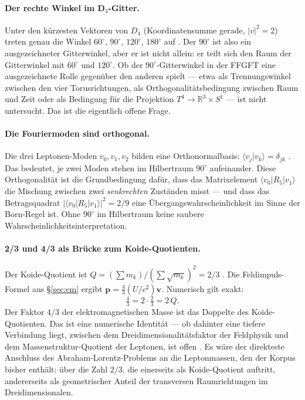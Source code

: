 \paragraph{Der rechte Winkel im D$_4$-Gitter.}
Unter den kürzesten Vektoren von $D_4$ (Koordinatensumme gerade,
$|v|^2 = 2$) treten genau die Winkel $60^\circ$, $90^\circ$, $120^\circ$,
$180^\circ$ auf \BM. Der $90^\circ$ ist also ein ausgezeichneter Gitterwinkel,
aber er ist nicht allein: er teilt sich den Raum der Gitterwinkel mit $60^\circ$
und $120^\circ$. Ob der $90^\circ$-Gitterwinkel in der FFGFT eine ausgezeichnete
Rolle gegenüber den anderen spielt --- etwa als Trennungswinkel zwischen den
vier Torusrichtungen, als Orthogonalitätsbedingung zwischen Raum und Zeit oder
als Bedingung für die Projektion $T^4 \to \mathbb R^3 \times S^1$ --- ist nicht
untersucht. Das ist die eigentlich offene Frage.

\paragraph{Die Fouriermoden sind orthogonal.}
Die drei Leptonen-Moden $v_0, v_1, v_2$ bilden eine Orthonormalbasis:
$\langle v_j | v_k\rangle = \delta_{jk}$ \BM. Das bedeutet, je zwei Moden stehen
im Hilbertraum $90^\circ$ aufeinander. Diese Orthogonalität ist die Grundbedingung
dafür, dass das Matrixelement $\langle v_0 | R_5 | v_1\rangle$ die Mischung
zwischen zwei \emph{senkrechten} Zuständen misst --- und dass das
Betragsquadrat $|\langle v_0|R_5|v_1\rangle|^2 = 2/9$ eine Übergangswahrscheinlichkeit
im Sinne der Born-Regel ist. Ohne $90^\circ$ im Hilbertraum keine saubere
Wahrscheinlichkeitsinterpretation.

\paragraph{2/3 und 4/3 als Brücke zum Koide-Quotienten.}
Der Koide-Quotient ist $Q = (\sum m_k)/(\sum\sqrt{m_k})^2 = 2/3$ \EM. Die
Feldimpuls-Formel aus §\ref{sec:em} ergibt $\mathbf p = \tfrac{4}{3}(U/c^2)\mathbf v$.
Numerisch gilt exakt:
\[
  \tfrac{4}{3} = 2 \cdot \tfrac{2}{3} = 2\,Q .
\]
Der Faktor $4/3$ der elektromagnetischen Masse ist das Doppelte des
Koide-Quotienten. Das ist eine numerische Identität --- ob dahinter eine
tiefere Verbindung liegt, zwischen dem Dreidimensionalitätsfaktor der
Feldphysik und dem Massenstruktur-Quotient der Leptonen, ist offen \SM.
Es wäre der direkteste Anschluss des Abraham-Lorentz-Problems an die
Leptonmassen, den der Korpus bisher enthält: über die Zahl $2/3$, die
einerseits als Koide-Quotient auftritt, andererseits als geometrischer
Anteil der transversen Raumrichtungen im Dreidimensionalen.

